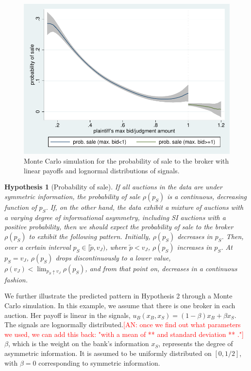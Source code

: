 \documentclass[11pt,twopage]{article}
\newcommand{\AN}[1]{\textcolor{red}{[AN: #1]}}
\newcommand{\AS}[1]{\textcolor{blue}{[AS: #1]}}
\newtheorem{conjecture}{Hypothesis}
{\bf}{\it}
\begin{document}
\begin{figure} %
  \centering
  \includegraphics[scale=0.6]{graphics/simulated_simple_discontinuity}
  \caption{Monte Carlo simulation for the probability of sale to the
    broker with linear payoffs and lognormal distributions of signals.}
%		
  \label{fig:theory-probability-of-sale_sim}
\end{figure}
\begin{conjecture}[Probability of sale]\label{hyp:discontinuity}
  If all auctions in the data are under symmetric information, the
  probability of sale $\rho(p_S)$ is a continuous, decreasing function
  of $p_S$. If, on the other hand, the data exhibit a mixture of
  auctions with a varying degree of informational asymmetry, including
  SI auctions with a positive probability, then we should expect the
  probability of sale to the broker $\rho(p_S)$ to exhibit the
  following pattern. Initially, $\rho(p_S)$ decreases in $p_S$. Then,
  over a certain interval $p_S \in [\tilde p, v_J)$, where $\tilde p <
  v_J$, $\rho(p_S)$ increases in $p_S$. At $p_S = v_J$, $\rho(p_S)$
  drops discontinuously to a lower value, $\rho(v_J)<\lim_{p_S
    \uparrow v_J} \rho(p_S)$, and from that point on, decreases in a
  continuous fashion.
\end{conjecture}

We further illustrate the predicted pattern in Hypothesis 2 through a Monte Carlo simulation. 
In this example, we
assume that there is one broker in each auction. Her payoff is linear in the signals,
$u_B(x_B,x_S) = (1-\beta) x_B+\beta x_S$. The signals are
lognormally distributed.\AN{once we find out what parameters we used, we
can add this back: "with a mean of ** and standard deviation ** ."}
$\beta$, which is the weight on the bank's information $x_S$, represents the degree of asymmetric information. It is assumed to be uniformly distributed on $[0,1/2]$, with $\beta =
0$ corresponding to symmetric information.
\end{document}
